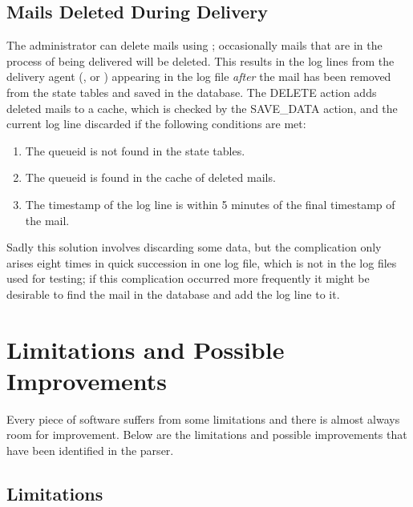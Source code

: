 \subsection{Mails Deleted During Delivery}

\label{Mails deleted during delivery}

The administrator can delete mails using ; occasionally
mails that are in the process of being delivered will be deleted.  This
results in the log lines from the delivery agent (,
 or ) appearing in the log file
\textit{after\/} the mail has been removed from the state tables and saved
in the database.  The DELETE action adds deleted mails to a cache, which is
checked by the SAVE\_DATA action, and the current log line discarded if the
following conditions are met:

\begin{enumerate}

    \item The queueid is not found in the state tables.

    \item The queueid is found in the cache of deleted mails.

    \item The timestamp of the log line is within 5 minutes of the final
        timestamp of the mail.

\end{enumerate}

Sadly this solution involves discarding some data, but the complication
only arises eight times in quick succession in one log file, which is not
in the \numberOFlogFILES{} log files used for testing; if this complication
occurred more frequently it might be desirable to find the mail in the
database and add the log line to it.

\section{Limitations and Possible Improvements}

\label{limitations and improvements in implementation}

Every piece of software suffers from some limitations and there is almost
always room for improvement.  Below are the limitations and possible
improvements that have been identified in the parser.

\subsection{Limitations}

